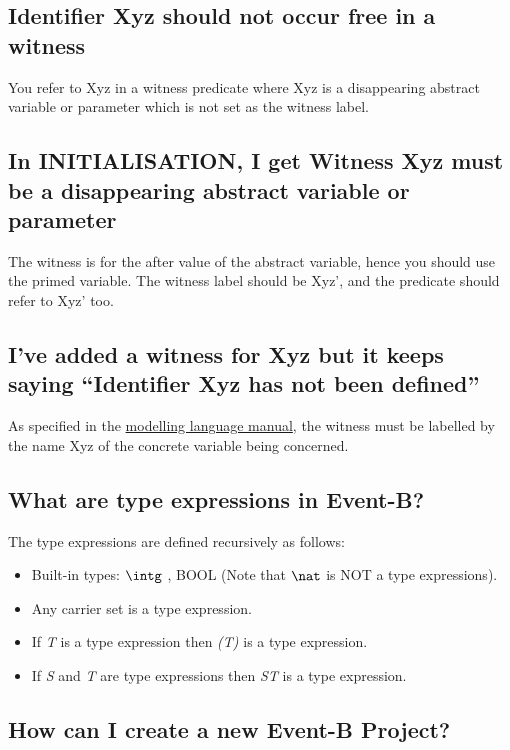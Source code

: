 \subsection{Identifier \textsf{Xyz} should not occur free in a witness}

You refer to \textsf{Xyz} in a witness predicate where \textsf{Xyz} is a disappearing abstract variable or parameter which is not set as the witness label. 

\subsection{In \textsf{INITIALISATION}, I get Witness \textsf{Xyz} must be a disappearing abstract variable or parameter}

The witness is for the after value of the abstract variable, hence you should use the primed variable. The witness label should be \textsf{Xyz'}, and the predicate should refer to \textsf{Xyz'} too. 

\subsection{I've added a witness for \textsf{Xyz} but it keeps saying ``Identifier \textsf{Xyz} has not been defined''}

As specified in the \href{http://wiki.event-b.org/index.php/Witnesses_(Modelling_Language)}{modelling language manual}, the witness must be labelled by the name \textsf{Xyz} of the concrete variable being concerned.

\subsection{What are type expressions in Event-B?}

The type expressions are defined recursively as follows: 

\begin{itemize}
	\item Built-in types: $\intg$ , BOOL (Note that $\nat$ is NOT a type expressions). 
	\item Any carrier set is a type expression. 
	\item If \textit{T} is a type expression then \textit{(T)} is a type expression. 
	\item If \textit{S} and \textit{T} are type expressions then \textit{ST} is a type expression. 
\end{itemize} 

\subsection{How can I create a new Event-B Project?}

